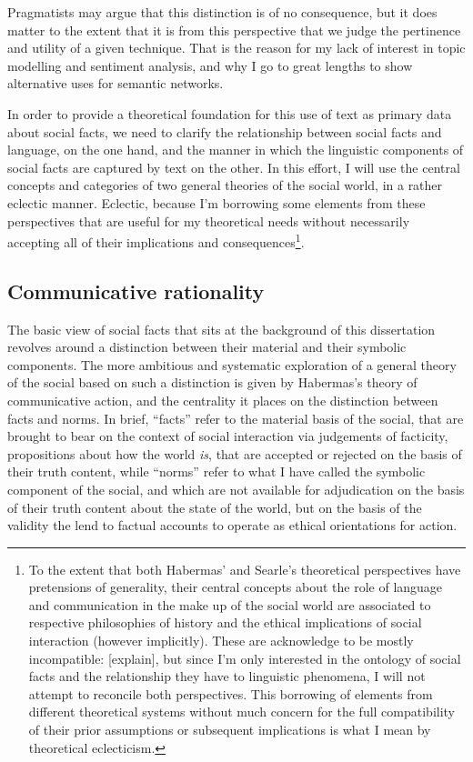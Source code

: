Pragmatists may argue that this distinction is of no consequence, but it does matter to the extent that it is from this perspective that we judge the pertinence and utility of a given technique.
That is the reason for my lack of interest in topic modelling and sentiment analysis, and why I go to great lengths to show alternative uses for semantic networks.

In order to provide a theoretical foundation for this use of text as primary data about social facts, we need to clarify the relationship between social facts and language, on the one hand, and the manner in which the linguistic components of social facts are captured by text on the other.
In this effort, I will use the central concepts and categories of two general theories of the social world, in a rather eclectic manner. Eclectic, because I'm borrowing some elements from these perspectives that are useful for my theoretical needs without necessarily accepting all of their implications and consequences\footnote{
    \label{foot:eclecticism}
    To the extent that both Habermas' and Searle's theoretical perspectives have pretensions of generality, their central concepts about the role of language and communication in the make up of the social world are associated to respective philosophies of history and the ethical implications of social interaction (however implicitly).
    These are acknowledge to be mostly incompatible: [explain], but since I'm only interested in the ontology of social facts and the relationship they have to linguistic phenomena, I will not attempt to reconcile both perspectives.
    This borrowing of elements from different theoretical systems without much concern for the full compatibility of their prior assumptions or subsequent implications is what I mean by theoretical eclecticism.
}.

\subsection{Communicative rationality}
\label{subsec:commact}

The basic view of social facts that sits at the background of this dissertation revolves around a distinction between their material and their symbolic components.
The more ambitious and systematic exploration of a general theory of the social based on such a distinction is given by Habermas's theory of communicative action, and the centrality it places on the distinction between facts and norms.
In brief, ``facts'' refer to the material basis of the social, that are brought to bear on the context of social interaction via judgements of facticity, propositions about how the world \emph{is}, that are accepted or rejected on the basis of their truth content, while ``norms'' refer to what I have called the symbolic component of the social, and which are not available for adjudication on the basis of their truth content about the state of the world, but on the basis of the validity the lend to factual accounts to operate as ethical orientations for action.

